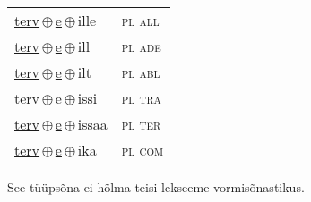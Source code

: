 \begin{minipage}{\textwidth}
\begin{sideways}
\begin{tabular}{l l}
\underline{terv}\,$\oplus$\,\underline{e}\,$\oplus$\,ille & \textsc{ pl all } \\
\underline{terv}\,$\oplus$\,\underline{e}\,$\oplus$\,ill & \textsc{ pl ade } \\
\underline{terv}\,$\oplus$\,\underline{e}\,$\oplus$\,ilt & \textsc{ pl abl } \\
\underline{terv}\,$\oplus$\,\underline{e}\,$\oplus$\,issi & \textsc{ pl tra } \\
\underline{terv}\,$\oplus$\,\underline{e}\,$\oplus$\,issaa & \textsc{ pl ter } \\
\underline{terv}\,$\oplus$\,\underline{e}\,$\oplus$\,ika & \textsc{ pl com } \\
\end{tabular}
\end{sideways}
\label{tab:tüüpsõnamall-terve}

\end{minipage}

 
\vspace{1em}
\noindent See tüüpsõna ei hõlma teisi lekseeme vormi\-sõnastikus.
